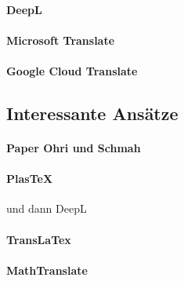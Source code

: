
\paragraph*{DeepL}\label{par:DeepL}
\paragraph*{Microsoft Translate}\label{par:Microsoft Translate}
\paragraph*{Google Cloud Translate}\label{par:Google Cloud Translate}

\subsection{Interessante Ansätze}
\paragraph*{Paper Ohri und Schmah}
\paragraph*{PlasTeX} und dann DeepL
\paragraph*{TransLaTex}
\paragraph*{MathTranslate}


